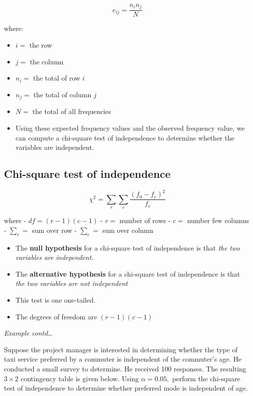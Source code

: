 \documentclass[]{book}
\providecommand{\tightlist}{%
  \setlength{\itemsep}{0pt}\setlength{\parskip}{0pt}}
\begin{document}
\[e_{ij} = \frac{n_in_j}{N}\]

where:

\begin{itemize}
\tightlist
\item
  \(i =\) the row
\item
  \(j =\) the column
\item
  \(n_i =\) the total of row \(i\)
\item
  \(n_j =\) the total of column \(j\)
\item
  \(N =\) the total of all frequencies
\end{itemize}

\begin{itemize}
\tightlist
\item
  Using these expected frequency values and the observed frequency value, we can compute a chi-square test of independence to determine whether the variables are independent.
\end{itemize}

\hypertarget{chi-square-test-of-independence}{%
\subsection{Chi-square test of independence}\label{chi-square-test-of-independence}}

\[\chi^2 =\sum_r\sum_c \frac{(f_0-f_e)^2}{f_e}\]

where
- \(df = (r-1)(c-1)\)
- \(r=\) number of rows
- \(c=\) number few columns
- \(\sum_r=\) sum over row
- \(\sum_c=\) sum over column

\begin{itemize}
\item
  The \textbf{null hypothesis} for a chi-square test of independence is that \emph{the two variables are independent}.
\item
  The \textbf{alternative hypothesis} for a chi-square test of independence is that \emph{the two variables are not independent}
\item
  This test is one one-tailed. 
\end{itemize}

\begin{itemize}
\tightlist
\item
  The degrees of freedom are \((r-1)(c-1)\)
\end{itemize}

\emph{Example contd\ldots{}}

Suppose the project manager is interested in determining whether the type of taxi service preferred by a commuter is independent of the commuter's age. He conducted a small survey to determine. He received 100 responses. The resulting \(3\times2\) contingency table is
given below. Using \(\alpha =0.05,\) perform the chi-square test of independence to determine whether preferred mode is independent of age.
\end{document}
